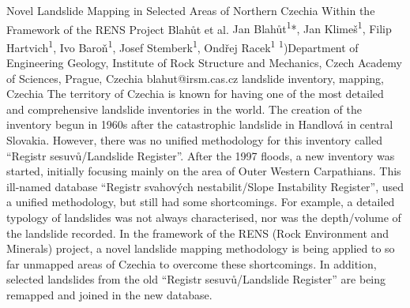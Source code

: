 \abstract
{Novel Landslide Mapping in Selected Areas of Northern Czechia Within the Framework of the RENS Project} 
{Blahůt et al.} 
{Jan Blahůt\textsuperscript{1}*, Jan Klimeš\textsuperscript{1}, Filip Hartvich\textsuperscript{1}, Ivo Baroň\textsuperscript{1}, Josef Stemberk\textsuperscript{1}, Ondřej Racek\textsuperscript{1}} 
{\POtag} 
{
\textsuperscript{1})Department of Engineering Geology, Institute of Rock Structure and Mechanics, Czech Academy of Sciences, Prague, Czechia
}
{blahut@irsm.cas.cz}  %
{landslide inventory, mapping, Czechia}
{The territory of Czechia is known for having one of the most detailed and comprehensive landslide inventories in the world. The creation of the inventory begun in 1960s after the catastrophic landslide in Handlová in central Slovakia. However, there was no unified methodology for this inventory called “Registr sesuvů/Landslide Register”. After the 1997 floods, a new inventory was started, initially focusing mainly on the area of Outer Western Carpathians. This ill-named database “Registr svahových nestabilit/Slope Instability Register”, used a unified methodology, but still had some shortcomings. For example, a detailed typology of landslides was not always characterised, nor was the depth/volume of the landslide recorded. In the framework of the RENS (Rock Environment and Minerals) project, a novel landslide mapping methodology is being applied to so far unmapped areas of Czechia to overcome these shortcomings. In addition, selected landslides from the old “Registr sesuvů/Landslide Register” are being remapped and joined in the new database. 
}
{
}


